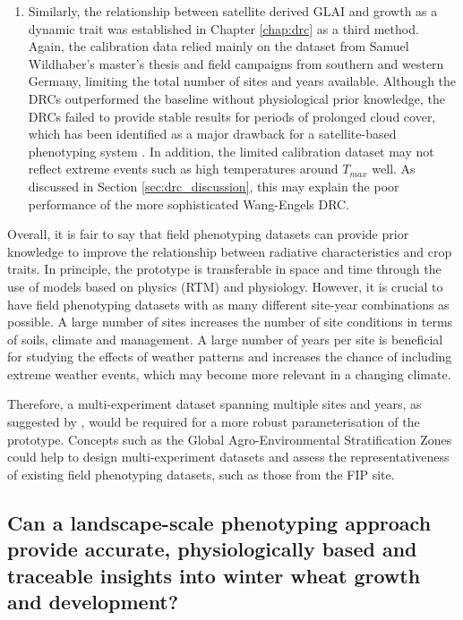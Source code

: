 \begin{enumerate}
\item Similarly, the relationship between satellite derived \gls{GLAI} and growth as a dynamic trait was established in Chapter \ref{chap:drc} as a third method. Again, the calibration data relied mainly on the dataset from Samuel Wildhaber's master's thesis and field campaigns from southern and western Germany, limiting the total number of sites and years available. Although the \gls{DRC}s outperformed the baseline without physiological prior knowledge, the \gls{DRC}s failed to provide stable results for periods of prolonged cloud cover, which has been identified as a major drawback for a satellite-based phenotyping system \citep{zhang_high-resolution_2020}. In addition, the limited calibration dataset may not reflect extreme events such as high temperatures around $T_{max}$ well. As discussed in Section \ref{sec:drc_discussion}, this may explain the poor performance of the more sophisticated Wang-Engels \gls{DRC}.

\end{enumerate}

Overall, it is fair to say that field phenotyping datasets can provide prior knowledge to improve the relationship between radiative characteristics and crop traits. In principle, the prototype is transferable in space and time through the use of models based on physics (\gls{RTM}) and physiology.
However, it is crucial to have field phenotyping datasets with as many different site-year combinations as possible. A large number of sites increases the number of site conditions in terms of soils, climate and management. A large number of years per site is beneficial for studying the effects of weather patterns and increases the chance of including extreme weather events, which may become more relevant in a changing climate.

Therefore, a multi-experiment dataset spanning multiple sites and years, as suggested by \cite{smith_scaling_2021}, would be required for a more robust parameterisation of the prototype. Concepts such as the Global Agro-Environmental Stratification Zones \citep{muecher_new_2016} could help to design multi-experiment datasets and assess the representativeness of existing field phenotyping datasets, such as those from the FIP site.

\subsection{Can a landscape-scale phenotyping approach provide accurate, physiologically based and traceable insights into winter wheat growth and development?}

